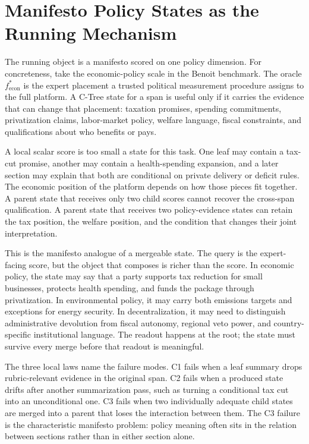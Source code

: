 \section{Manifesto Policy States as the Running Mechanism}
\label{sec:v8-manifesto-mechanism}

The running object is a manifesto scored on one policy dimension. For
concreteness, take the economic-policy scale in the Benoit benchmark. The
oracle \(f^\ast_{\mathrm{econ}}\) is the expert placement a trusted political
measurement procedure assigns to the full platform. A C-Tree state for a span
is useful only if it carries the evidence that can change that placement:
taxation promises, spending commitments, privatization claims, labor-market
policy, welfare language, fiscal constraints, and qualifications about who
benefits or pays.

A local scalar score is too small a state for this task. One leaf may contain
a tax-cut promise, another may contain a health-spending expansion, and a later
section may explain that both are conditional on private delivery or deficit
rules. The economic position of the platform depends on how those pieces fit
together. A parent state that receives only two child scores cannot recover the
cross-span qualification. A parent state that receives two policy-evidence
states can retain the tax position, the welfare position, and the condition
that changes their joint interpretation.

This is the manifesto analogue of a mergeable state. The query is the
expert-facing score, but the object that composes is richer than the score. In
economic policy, the state may say that a party supports tax reduction for
small businesses, protects health spending, and funds the package through
privatization. In environmental policy, it may carry both emissions targets and
exceptions for energy security. In decentralization, it may need to distinguish
administrative devolution from fiscal autonomy, regional veto power, and
country-specific institutional language. The readout happens at the root; the
state must survive every merge before that readout is meaningful.

The three local laws name the failure modes. C1 fails when a leaf summary drops
rubric-relevant evidence in the original span. C2 fails when a produced state
drifts after another summarization pass, such as turning a conditional tax cut
into an unconditional one. C3 fails when two individually adequate child states
are merged into a parent that loses the interaction between them. The C3
failure is the characteristic manifesto problem: policy meaning often sits in
the relation between sections rather than in either section alone.

